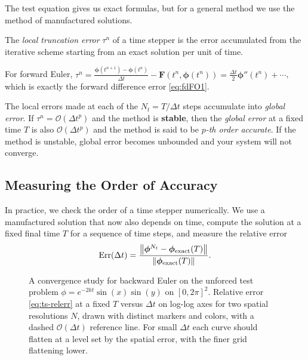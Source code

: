 \begin{remark}
The test equation gives us exact formulas, but for a general method we use the
method of manufactured solutions.
\end{remark}

\begin{definition}
The \emph{local truncation error} $\tau^n$ of a time stepper is the error accumulated from the iterative scheme starting from an exact solution per unit of time. \end{definition}

For forward Euler, $\tau^n = \frac{\boldsymbol{\phi}(t^{n+1})-\boldsymbol{\phi}(t^n)}{\Delta t} -
\mathbf{F}(t^n,\boldsymbol{\phi}(t^n)) = \frac{\Delta t}{2}\boldsymbol{\phi}''(t^n) + \cdots$,
which is exactly the forward difference error \eqref{eq:fdFO1}. 



The
local errors made at each of the $N_t = T/\Delta t$ steps accumulate into \textit{global error}. If $\tau^n = \mathcal{O}(\Delta t^p)$ and
the method is \textbf{stable}, then the \textit{global error} at a fixed time $T$ is also
$\mathcal{O}(\Delta t^p)$ and the method is said to be \emph{$p$-th order accurate}. If the method is unstable, global error becomes unbounded and your system will not converge.

\subsection{Measuring the Order of Accuracy}
\label{sec:ts-measure}

In practice, we check the order of a time stepper numerically. We use a manufactured solution that now also depends on time, compute the solution at a fixed
final time $T$ for a sequence of time steps, and measure the relative error
\begin{equation}
  \text{Err}(\Delta t) =
  \frac{\norm{\boldsymbol{\phi}^{N_t} - \boldsymbol{\phi}_{\text{exact}}(T)}}
       {\norm{\boldsymbol{\phi}_{\text{exact}}(T)}}.
  \label{eq:ts-relerr}
\end{equation}


\begin{figure}[htbp]
  \centering
  \TSfigplaceholder{6cm}
  \caption{A convergence study for backward Euler on the unforced test problem $\phi = e^{-2kt}\sin(x)\sin(y)$ on $[0,2\pi]^2$. Relative error \eqref{eq:ts-relerr} at a fixed $T$ versus $\Delta t$ on log-log axes for two spatial resolutions $N$, drawn with distinct markers and colors, with a dashed $\mathcal{O}(\Delta t)$ reference line. For small $\Delta t$ each curve should flatten at a level set by the spatial error, with the finer grid flattening lower.}
  \label{fig:ts-convergence}
\end{figure}



